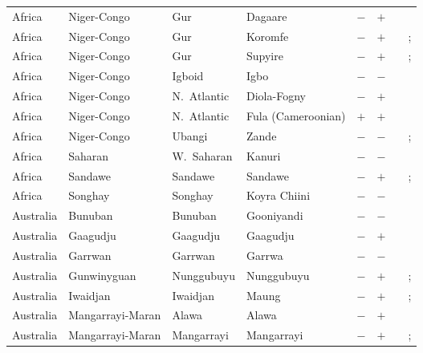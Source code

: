 \begin{landscape}
\begin{longtable}{l>{\raggedright\arraybackslash}p{2.2cm}>{\raggedright}p{2.5cm}>{\raggedright\arraybackslash}p{2.5cm}cc>{\raggedright\arraybackslash}p{3.4cm}>{\raggedright\arraybackslash}p{3.4cm}}
Africa & Niger-Congo & Gur & Dagaare & $-$ & $+$ & \citealt{Gil2013} & \citealt[45--48]{Grimm2012}\\
Africa & Niger-Congo & Gur & Koromfe & $-$ & $+$ & \citealt{Gil2013} & \citealt{Corbett2013}; \citealt[206--233]{Rennison1997}\\
Africa & Niger-Congo & Gur & Supyire & $-$ & $+$ & \citealt{Gil2013} & \citealt{Corbett2013}; \citealt[75]{Carlson1994}\\
Africa & Niger-Congo & Igboid & Igbo & $-$ & $-$ & \citealt{Gil2013} & \citealt{Corbett2013}\\
Africa & Niger-Congo & N.~Atlantic & Diola-Fogny & $-$ & $+$ & \citealt[74]{Sapir1965}& \citealt[24--25, 61--62]{Sapir1965}\\
Africa & Niger-Congo & N.~Atlantic & Fula (Cameroonian) & $+$ & $+$ & \citealt[295]{Nichols1992}& \citealt[295]{Nichols1992}\\
Africa & Niger-Congo & Ubangi & Zande & $-$ & $-$ & \citealt[42--45]{Gore1926}& \citealt{Corbett2013}; \citealt[20--23]{Gore1926}\\
Africa & Saharan & W.~Saharan & Kanuri & $-$ & $-$ & \citealt{Gil2013} & \citealt{Corbett2013}\\
Africa & Sandawe & Sandawe & Sandawe & $-$ & $+$ & \citealt{Gil2013} & \citealt[295]{Nichols1992}; \citealt[14--17]{Eaton2010}\\
Africa & Songhay & Songhay & Koyra Chiini & $-$ & $-$ & \citealt{Gil2013} & \citealt[55]{Heath1999}\\
Australia & Bunuban & Bunuban & Gooniyandi & $-$ & $-$ & \citealt{Gil2013} & \citealt{Corbett2013}\\
Australia & Gaagudju & Gaagudju & Gaagudju & $-$ & $+$ & \citealt{Gil2013} & \citealt[144--157]{Harvey2002}\\
Australia & Garrwan & Garrwan & Garrwa & $-$ & $-$ & \citealt{Gil2013} & \citealt[38, 190]{Mushin2012}\\
Australia & Gunwinyguan & Nunggubuyu & Nunggubuyu & $-$ & $+$ & \citealt{Gil2013} & \citealt{Corbett2013}; \citealt[131--132]{Heath1983}\\
Australia & Iwaidjan & Iwaidjan & Maung & $-$ & $+$ & \citealt{Gil2013} & \citealt{Corbett2013}; \citealt[73--77]{Capell1970}\\
Australia & Mangarrayi-Maran & Alawa & Alawa & $-$ & $+$ & \citealt[passim]{Sharpe1972} & \citealt[66, 79--80]{Sharpe1972}\\
Australia & Mangarrayi-Maran & Mangarrayi & Mangarrayi & $-$ & $+$ & \citealt{Gil2013} & \citealt{Corbett2013}; \citealt[297]{Nichols1992}\\

\end{longtable}
\end{landscape}
